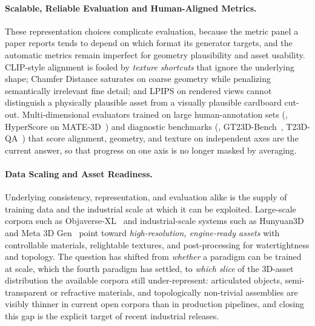 \paragraph{Scalable, Reliable Evaluation and Human-Aligned Metrics.}
These representation choices complicate evaluation, because the metric panel a paper reports tends to depend on which format its generator targets, and the automatic metrics remain imperfect for geometry plausibility and asset usability.
CLIP-style alignment is fooled by \emph{texture shortcuts} that ignore the underlying shape; Chamfer Distance saturates on coarse geometry while penalizing semantically irrelevant fine detail; and LPIPS on rendered views cannot distinguish a physically plausible asset from a visually plausible cardboard cut-out.
Multi-dimensional evaluators trained on large human-annotation sets (\eg, HyperScore on MATE-3D~\cite{zhang2025mate3d}) and diagnostic benchmarks (\eg, GT23D-Bench~\cite{cai2024gt23d}, T23D-QA~\cite{li2025t23d}) that score alignment, geometry, and texture on independent axes are the current answer, so that progress on one axis is no longer masked by averaging.

\paragraph{Data Scaling and Asset Readiness.}
Underlying consistency, representation, and evaluation alike is the supply of training data and the industrial scale at which it can be exploited.
Large-scale corpora such as Objaverse-XL~\cite{deitke2023objaversexl} and industrial-scale systems such as Hunyuan3D~\cite{hunyuan3d22025tencent, hunyuan3d2025hunyuan3domni} and Meta 3D Gen~\cite{bensadoun2024meta3dgen} point toward \emph{high-resolution, engine-ready assets} with controllable materials, relightable textures, and post-processing for watertightness and topology.
The question has shifted from \emph{whether} a paradigm can be trained at scale, which the fourth paradigm has settled, to \emph{which slice} of the 3D-asset distribution the available corpora still under-represent: articulated objects, semi-transparent or refractive materials, and topologically non-trivial assemblies are visibly thinner in current open corpora than in production pipelines, and closing this gap is the explicit target of recent industrial releases.
